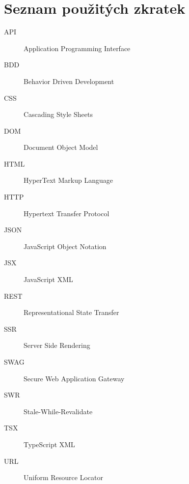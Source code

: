 \chapter{Seznam použitých zkratek}
\begin{description}
	\item[API] Application Programming Interface
	\item[BDD] Behavior Driven Development 
	\item[CSS] Cascading Style Sheets   
	\item[DOM] Document Object Model 
	\item[HTML] HyperText Markup Language
	\item[HTTP] Hypertext Transfer Protocol 
	\item[JSON] JavaScript Object Notation
	\item[JSX] JavaScript XML 
	\item[REST] Representational State Transfer 
	\item[SSR] Server Side Rendering
	\item[SWAG] Secure Web Application Gateway 
	\item[SWR] Stale-While-Revalidate
	\item[TSX] TypeScript XML 
	\item[URL] Uniform Resource Locator 
\end{description}
